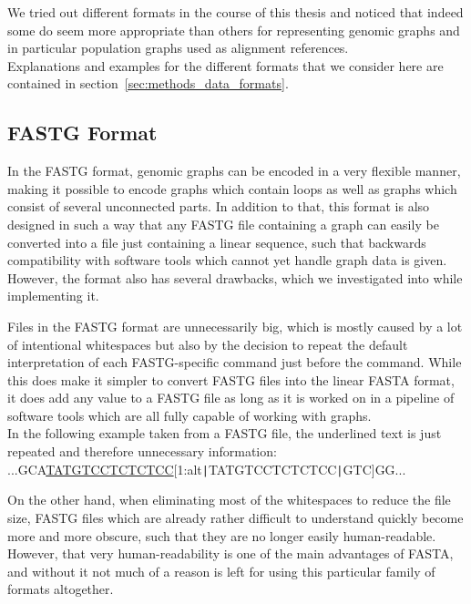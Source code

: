 \documentclass[a4paper,12pt,twoside,BCOR=10mm]{scrbook}
\def\pipe{\texttt{|}}
\begin{document}
We tried out different formats in the course of this thesis
and noticed that indeed some do seem more appropriate than others
for representing genomic graphs
and in particular population graphs used as alignment references. \\
Explanations and examples for the different formats that we consider here
are contained in section~\ref{sec:methods_data_formats}.

\subsection{FASTG Format}

In the FASTG format, genomic graphs can be encoded in a very flexible manner,
making it possible to encode graphs which contain loops as well as graphs
which consist of several unconnected parts.
In addition to that, this format is also designed in such a way that any
FASTG file containing a graph can easily be converted into a file just containing
a linear sequence, such that backwards compatibility with software tools which
cannot yet handle graph data is given. \\
However, the format also has several drawbacks, which we investigated into
while implementing it.

Files in the FASTG format are unnecessarily big, which is mostly caused
by a lot of intentional whitespaces but also by the decision to repeat the
default interpretation of each FASTG-specific command just before the command.
While this does make it simpler to convert FASTG files into the linear FASTA format,
it does add any value to a FASTG file as long as it is worked on in a pipeline of
software tools which are all fully capable of working with graphs. \\
In the following example taken from a FASTG file, the underlined
text is just repeated and therefore unnecessary information: \\
...GCA\underline{TATGTCCTCTCTCC}[1:alt\pipe TATGTCCTCTCTCC\pipe GTC]GG...

On the other hand, when eliminating most of the whitespaces to reduce the file size,
FASTG files which are already rather difficult to understand quickly
become more and more obscure, such that they are no longer easily human-readable.
However, that very human-readability is one of the main advantages of FASTA,
and without it not much of a reason is left for using this particular family
of formats altogether.
\end{document}
